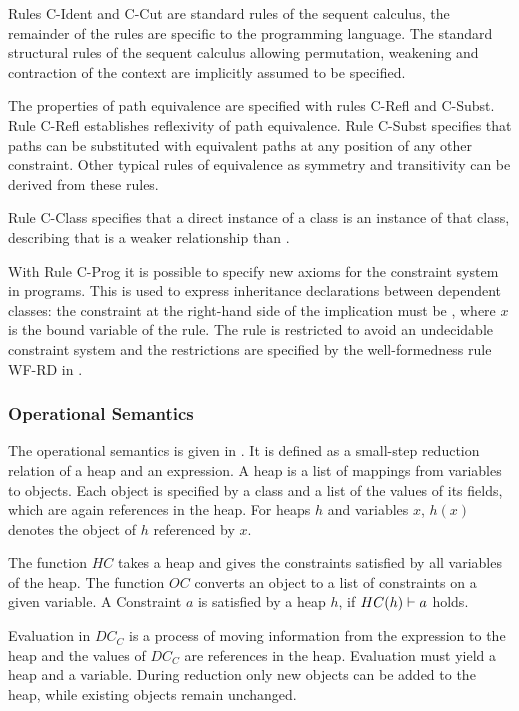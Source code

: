 Rules C-Ident and C-Cut are standard rules of the sequent calculus,
the remainder of the rules are specific to the programming language.
The standard structural rules of the sequent calculus allowing
permutation, weakening and contraction of the context
are implicitly assumed to be specified.

The properties of path equivalence are specified with rules C-Refl and C-Subst.
Rule C-Refl establishes reflexivity of path equivalence.
Rule C-Subst specifies that paths can be substituted with equivalent paths
at any position of any other constraint.
Other typical rules of equivalence as symmetry and transitivity can be
derived from these rules.

Rule C-Class specifies that a direct instance of a class
is an instance of that class, describing that
 is a weaker relationship than .

With Rule C-Prog it is possible to specify new axioms for the constraint system in programs.
This is used to express inheritance declarations between dependent classes:
the constraint at the right-hand side of the implication must be ,
where $x$ is the bound variable of the rule.
The rule is restricted to avoid an undecidable constraint system
and the restrictions are specified by the well-formedness rule WF-RD in .

\subsubsection{Operational Semantics}
The operational semantics is given in .
It is defined as a small-step reduction relation of a heap and an expression.
A heap is a list of mappings from variables to objects.
Each object is specified by a class and a list of the values of its fields,
which are again references in the heap.
For heaps $h$ and variables $x$, $h(x)$ denotes the object of $h$ referenced by $x$.

The function $HC$ takes a heap and gives the constraints satisfied by all variables of the heap.
The function $OC$ converts an object %
to a list of constraints on a given variable.
A Constraint $a$ is satisfied by a heap $h$, if $HC(h) \vdash a$ holds.

Evaluation in $DC_C$ is a process of moving information from the expression to the heap
and the values of $DC_C$ are references in the heap.
Evaluation must yield a heap and a variable.
During reduction only new objects can be added to the heap,
while existing objects remain unchanged.

